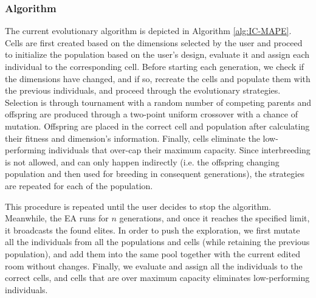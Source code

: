 \subsubsection{Algorithm}

The current evolutionary algorithm is depicted in Algorithm \ref{alg:IC-MAPE}. Cells are first created based on the dimensions selected by the user and proceed to initialize the population based on the user's design, evaluate it and assign each individual to the corresponding cell. Before starting each generation, we check if the dimensions have changed, and if so, recreate the cells and populate them with the previous individuals, and proceed through the evolutionary strategies. Selection is through tournament with a random number of competing parents and offspring are produced through a two-point uniform crossover with a chance of mutation. Offspring are placed in the correct cell and population after calculating their fitness and dimension's information. Finally, cells eliminate the low-performing individuals that over-cap their maximum capacity. Since interbreeding is not allowed, and can only happen indirectly (i.e. the offspring changing population and then used for breeding in consequent generations), the strategies are repeated for each of the population.

This procedure is repeated until the user decides to stop the algorithm. Meanwhile, the EA runs for $n$ generations, and once it reaches the specified limit, it broadcasts the found elites. In order to push the exploration, we first mutate all the individuals from all the populations and cells (while retaining the previous population), and add them into the same pool together with the current edited room without changes. Finally, we evaluate and assign all the individuals to the correct cells, and cells that are over maximum capacity eliminates low-performing individuals.



